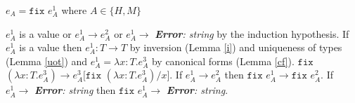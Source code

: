 \begin{case}

$e_{A}=\mathtt{fix}$ $e_{A}^{1}$ where $A\in\lbrace H,M\rbrace$

$e_{A}^{1}$ is a value or $e_{A}^{1}\rightarrow e_{A}^{2}$ or $e_{A}^{1}\rightarrow$ \emph{\textbf{Error}: string} by the induction hypothesis.  If $e_{A}^{1}$ is a value then $e_{A}^{1}:T\rightarrow T$ by inversion (Lemma \ref{i}) and uniqueness of types (Lemma \ref{uot}) and $e_{A}^{1}=\lambda x:T.e_{A}^{3}$ by canonical forms (Lemma \ref{cf}).  $\mathtt{fix}$ $(\lambda x:T.e_{A}^{3})\rightarrow e_{A}^{3}[\mathtt{fix}$ $(\lambda x:T.e_{A}^{3})/x]$.  If $e_{A}^{1}\rightarrow e_{A}^{2}$ then $\mathtt{fix}$ $e_{A}^{1}\rightarrow\mathtt{fix}$ $e_{A}^{2}$.  If $e_{A}^{1}\rightarrow$ \emph{\textbf{Error}: string} then $\mathtt{fix}$ $e_{A}^{1}\rightarrow$ \emph{\textbf{Error}: string}.

\end{case}